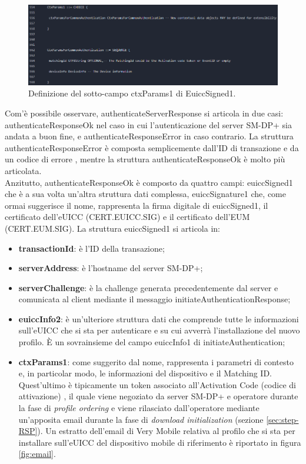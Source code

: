 \documentclass[10pt, oneside]{book}
\begin{document}
\begin{figure}
\includegraphics[width=\linewidth]{def-authenticateServerResponse3.png}
\caption{Definizione del sotto-campo ctxParams1 di EuiccSigned1.}
\label{fig:def-authenticateServerResponse3}
\end{figure}
Com'è possibile osservare, authenticateServerResponse si articola in due casi: authenticateResponseOk nel caso in cui l'autenticazione del server SM-DP+ sia andata a buon fine, e authenticateResponseError in caso contrario. La struttura authenticateResponseError è composta semplicemente dall'ID di transazione e da un codice di errore \cite{RSP-definitions}, mentre la struttura authenticateResponseOk è molto più articolata.\\
Anzitutto, authenticateResponseOk è composto da quattro campi: euiccSigned1 che è a sua volta un'altra struttura dati complessa, euiccSignature1 che, come ormai suggerisce il nome, rappresenta la firma digitale di euiccSigned1, il certificato dell'eUICC (CERT.EUICC.SIG) e il certificato dell'EUM (CERT.EUM.SIG). La struttura euiccSigned1 si articola in:
\begin{itemize}
\item \textbf{transactionId}: è l'ID della transazione;
\item \textbf{serverAddress}: è l'hostname del server SM-DP+;
\item \textbf{serverChallenge}: è la challenge generata precedentemente dal server e comunicata al client mediante il messaggio initiateAuthenticationResponse;
\item \textbf{euiccInfo2}: è un'ulteriore struttura dati che comprende tutte le informazioni sull'eUICC che si sta per autenticare e su cui avverrà l'installazione del nuovo profilo. È un sovrainsieme del campo euiccInfo1 di initiateAuthentication;
\item \textbf{ctxParams1}: come suggerito dal nome, rappresenta i parametri di contesto e, in particolar modo, le informazioni del dispositivo e il Matching ID. Quest'ultimo è tipicamente un token associato all'Activation Code (codice di attivazione) \cite{RSP-definitions}, il quale viene negoziato da server SM-DP+ e operatore durante la fase di \textit{profile ordering} e viene rilasciato dall'operatore mediante un'apposita email durante la fase di \textit{download initialization} (sezione \ref{sec:step-RSP}). Un estratto dell'email di Very Mobile relativa al profilo che si sta per installare sull'eUICC del dispositivo mobile di riferimento è riportato in figura \ref{fig:email}.
\end{itemize}
\end{document}
